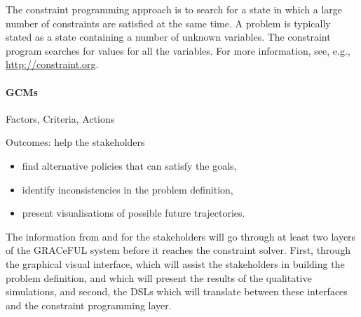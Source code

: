 The constraint programming approach is to search for a state in which a large
number of constraints are satisfied at the same time. A problem is typically
stated as a state containing a number of unknown variables. The constraint
program searches for values for all the variables. For more information, see,
e.g., \url{http://constraint.org}.

\paragraph{\acfp{GCM}}

Factors, Criteria, Actions

Outcomes: help the stakeholders

\begin{itemize}
\item find alternative policies that can satisfy the goals,
\item identify inconsistencies in the problem definition,
\item  present visualisations of possible future trajectories.
\end{itemize}

The information from and for the stakeholders will go through at least
two layers of the GRACeFUL system before it reaches the constraint
solver. First, through the graphical visual interface, which will
assist the stakeholders in building the problem definition, and which
will present the results of the qualitative simulations, and second,
the DSLs which will translate between these interfaces and the
constraint programming layer.




